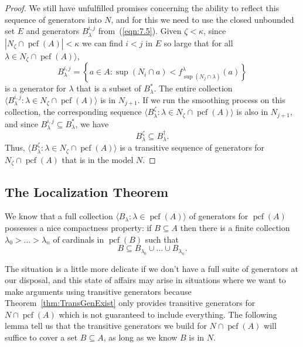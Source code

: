 \documentclass[10pt]{amsart}
\theoremstyle{plain}
\theoremstyle{definition}
\theoremstyle{remark}
\DeclareMathOperator{\pcf}{pcf}
\numberwithin{equation}{section}
\begin{document}
\begin{proof}
We still have unfulfilled promises concerning the ability to reflect this sequence of generators into $N$, and for this we need to use
the closed unbounded set $E$ and generators $B^{i,j}_\lambda$  from~(\ref{eqn:7.5}).  Given $\zeta<\kappa$, since $|N_\zeta\cap\pcf(A)|<\kappa$
we can find $i<j$ in $E$ so large that for all $\lambda\in N_\zeta\cap\pcf(A)\rangle$,
\begin{equation}
B^{i,j}_\lambda = \left\{a\in A: \sup(N_i\cap a)<f^{\lambda}_{\sup(N_j\cap\lambda)}(a)\right\}
\end{equation}
is  a generator for $\lambda$ that is a subset of $B^*_\lambda$.  The entire collection $\langle B^{i,j}_\lambda:\lambda\in N_\zeta\cap\pcf(A)\rangle$
is in $N_{j+1}$.  If we run the smoothing process on this collection, the corresponding sequence $\langle B^\zeta_\lambda:\lambda\in N_\zeta\cap\pcf(A)\rangle$
is also in $N_{j+1}$, and since $B^{i,j}_\lambda\subseteq B^*_\lambda$, we have
\begin{equation}
B^\zeta_{\lambda}\subseteq B^{\dagger}_\lambda.
\end{equation}
Thus, $\langle B^\zeta_\lambda:\lambda\in N_\zeta\cap\pcf(A)\rangle$ is a transitive sequence of generators for $N_\zeta\cap\pcf(A)$ that
is in the model $N$.

\end{proof}

\subsection{The Localization Theorem}

We know that a full collection $\langle B_\lambda:\lambda\in\pcf(A)\rangle$ of generators for $\pcf(A)$ possesses a nice
compactness property:
if $B\subseteq A$ then there is a finite collection $\lambda_0>\dots>\lambda_n$ of cardinals in $\pcf(B)$ such that
\begin{equation}
B\subseteq B_{\lambda_0}\cup\dots\cup B_{\lambda_n}.
\end{equation}


The situation is a little more delicate if we don't have a full suite of generators at our disposal, and this state of affairs may arise
in situations where we want to make arguments using transitive generators because Theorem~\ref{thm:TransGenExist} only provides transitive
generators for $N\cap\pcf(A)$ which is not guaranteed to include everything.   The following lemma tell us that the transitive generators
we build for $N\cap\pcf(A)$ will suffice to cover a set $B\subseteq A$, as long as we know $B$ is in $N$.
\end{document}
